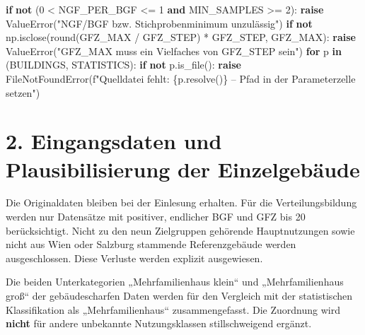 \documentclass[
  ngerman,
  a4paper,
  DIV=11]{scrreprt}
\newenvironment{Shaded}{\begin{snugshade}}{\end{snugshade}}
\newcommand{\BuiltInTok}[1]{\textcolor[rgb]{0.00,0.23,0.31}{#1}}
\newcommand{\ControlFlowTok}[1]{\textcolor[rgb]{0.00,0.23,0.31}{\textbf{#1}}}
\newcommand{\DecValTok}[1]{\textcolor[rgb]{0.68,0.00,0.00}{#1}}
\newcommand{\KeywordTok}[1]{\textcolor[rgb]{0.00,0.23,0.31}{\textbf{#1}}}
\newcommand{\NormalTok}[1]{\textcolor[rgb]{0.00,0.23,0.31}{#1}}
\newcommand{\OperatorTok}[1]{\textcolor[rgb]{0.37,0.37,0.37}{#1}}
\newcommand{\PreprocessorTok}[1]{\textcolor[rgb]{0.68,0.00,0.00}{#1}}
\newcommand{\SpecialCharTok}[1]{\textcolor[rgb]{0.37,0.37,0.37}{#1}}
\newcommand{\SpecialStringTok}[1]{\textcolor[rgb]{0.13,0.47,0.30}{#1}}
\newcommand{\StringTok}[1]{\textcolor[rgb]{0.13,0.47,0.30}{#1}}
\begin{document}
\begin{Shaded}
\begin{Highlighting}[]
\ControlFlowTok{if} \KeywordTok{not}\NormalTok{ (}\DecValTok{0} \OperatorTok{\textless{}}\NormalTok{ NGF\_PER\_BGF }\OperatorTok{\textless{}=} \DecValTok{1} \KeywordTok{and}\NormalTok{ MIN\_SAMPLES }\OperatorTok{\textgreater{}=} \DecValTok{2}\NormalTok{):}
    \ControlFlowTok{raise} \PreprocessorTok{ValueError}\NormalTok{(}\StringTok{"NGF/BGF bzw. Stichprobenminimum unzulässig"}\NormalTok{)}
\ControlFlowTok{if} \KeywordTok{not}\NormalTok{ np.isclose(}\BuiltInTok{round}\NormalTok{(GFZ\_MAX }\OperatorTok{/}\NormalTok{ GFZ\_STEP) }\OperatorTok{*}\NormalTok{ GFZ\_STEP, GFZ\_MAX):}
    \ControlFlowTok{raise} \PreprocessorTok{ValueError}\NormalTok{(}\StringTok{"GFZ\_MAX muss ein Vielfaches von GFZ\_STEP sein"}\NormalTok{)}
\ControlFlowTok{for}\NormalTok{ p }\KeywordTok{in}\NormalTok{ (BUILDINGS, STATISTICS):}
    \ControlFlowTok{if} \KeywordTok{not}\NormalTok{ p.is\_file():}
        \ControlFlowTok{raise} \PreprocessorTok{FileNotFoundError}\NormalTok{(}\SpecialStringTok{f"Quelldatei fehlt: }\SpecialCharTok{\{}\NormalTok{p}\SpecialCharTok{.}\NormalTok{resolve()}\SpecialCharTok{\}}\SpecialStringTok{ – Pfad in der Parameterzelle setzen"}\NormalTok{)}
\end{Highlighting}
\end{Shaded}

\section{2. Eingangsdaten und Plausibilisierung der
Einzelgebäude}\label{eingangsdaten-und-plausibilisierung-der-einzelgebuxe4ude}

Die Originaldaten bleiben bei der Einlesung erhalten. Für die
Verteilungsbildung werden nur Datensätze mit positiver, endlicher BGF
und GFZ bis 20 berücksichtigt. Nicht zu den neun Zielgruppen gehörende
Hauptnutzungen sowie nicht aus Wien oder Salzburg stammende
Referenzgebäude werden ausgeschlossen. Diese Verluste werden explizit
ausgewiesen.

Die beiden Unterkategorien „Mehrfamilienhaus klein`` und
„Mehrfamilienhaus groß`` der gebäudescharfen Daten werden für den
Vergleich mit der statistischen Klassifikation als „Mehrfamilienhaus``
zusammengefasst. Die Zuordnung wird \textbf{nicht} für andere unbekannte
Nutzungsklassen stillschweigend ergänzt.
\end{document}

